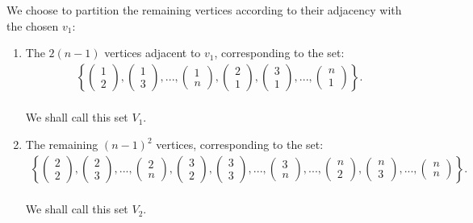 We choose to partition the remaining vertices according to their adjacency with the chosen $v_1$:
\begin{enumerate}
    \item The \( 2(n-1) \) vertices adjacent to \( v_1 \), corresponding to the set:
    \begin{align*}
        \left\{ \begin{pmatrix} 1 \\ 2 \end{pmatrix}, \begin{pmatrix} 1 \\ 3 \end{pmatrix},..., \begin{pmatrix} 1 \\ n \end{pmatrix}, \begin{pmatrix} 2 \\ 1 \end{pmatrix}, \begin{pmatrix} 3 \\ 1 \end{pmatrix},..., \begin{pmatrix} n \\ 1 \end{pmatrix} \right\}.
    \end{align*} \\
    We shall call this set $V_1$.
    \item The remaining \( (n-1)^2 \) vertices, corresponding to the set:
    \begin{align*}
        \left\{ \begin{pmatrix} 2 \\ 2 \end{pmatrix}, \begin{pmatrix} 2 \\ 3 \end{pmatrix},...,\begin{pmatrix} 2 \\ n \end{pmatrix},\begin{pmatrix} 3 \\ 2 \end{pmatrix}, \begin{pmatrix} 3 \\ 3 \end{pmatrix},...,\begin{pmatrix} 3 \\ n \end{pmatrix},...,\begin{pmatrix} n \\ 2 \end{pmatrix}, \begin{pmatrix} n \\ 3 \end{pmatrix},...,\begin{pmatrix} n \\ n \end{pmatrix} \right \}.
    \end{align*} \\
    We shall call this set $V_2$.
\end{enumerate}

